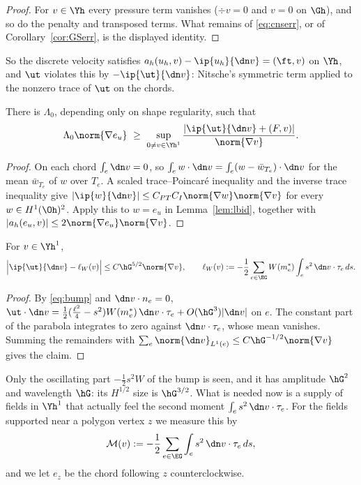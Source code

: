\begin{proof}
For $v\in\Yh$ every pressure term vanishes ($\div v=0$ and $v=0$ on $\Gh$), and so do the penalty and transposed terms. What remains of \eqref{eq:cnserr}, or of Corollary~\ref{cor:GSerr}, is the displayed identity.
\end{proof}

So the discrete velocity satisfies $a_h(u_h,v)-\ip{u_h}{\dn v}=(\ft,v)$ on $\Yh$, and $\ut$ violates this by $-\ip{\ut}{\dn v}$: Nitsche's symmetric term applied to the nonzero trace of $\ut$ on the chords.

\begin{lemma}\label{lem:lbabs}
There is $\Lambda_0$, depending only on shape regularity, such that
\[
\Lambda_0\norm{\nabla e_u}\ \ge\ \sup_{0\ne v\in\Yh^1}\frac{|\ip{\ut}{\dn v}+(F,v)|}{\norm{\nabla v}} .
\]
\end{lemma}

\begin{proof}
On each chord $\int_e\dn v=0$, so $\int_ew\cdot\dn v=\int_e(w-\bar w_{T_e})\cdot\dn v$ for the mean $\bar w_{T_e}$ of $w$ over $T_e$. A scaled trace--Poincar\'e inequality and the inverse trace inequality give $|\ip{w}{\dn v}|\le C_{PT}C_I\norm{\nabla w}\norm{\nabla v}$ for every $w\in H^1(\Oh)^2$. Apply this to $w=e_u$ in Lemma~\ref{lem:lbid}, together with $|a_h(e_u,v)|\le2\norm{\nabla e_u}\norm{\nabla v}$.
\end{proof}

\begin{lemma}\label{lem:lbexp}
For $v\in\Yh^1$,
\[
\Bigl|\ip{\ut}{\dn v}-\ell_W(v)\Bigr|\le C\hG^{5/2}\norm{\nabla v},\qquad \ell_W(v):=-\frac12\sum_{e\in\EG}W(m_e^\ast)\int_e s^2\,\dn v\cdot\tau_e\,ds .
\]
\end{lemma}

\begin{proof}
By \eqref{eq:bump} and $\dn v\cdot n_e=0$, $\ut\cdot\dn v=\frac12(\frac{\ell^2}4-s^2)W(m_e^\ast)\,\dn v\cdot\tau_e+O(\hG^3)|\dn v|$ on $e$. The constant part of the parabola integrates to zero against $\dn v\cdot\tau_e$, whose mean vanishes. Summing the remainders with $\sum_e\norm{\dn v}_{L^1(e)}\le C\hG^{-1/2}\norm{\nabla v}$ gives the claim.
\end{proof}

Only the oscillating part $-\frac12s^2W$ of the bump is seen, and it has amplitude $\hG^2$ and wavelength $\hG$: its $H^{1/2}$ size is $\hG^{3/2}$. What is needed now is a supply of fields in $\Yh^1$ that actually feel the second moment $\int_es^2\,\dn v\cdot\tau_e$. For the fields supported near a polygon vertex $z$ we measure this by
\[
\mathcal M(v):=-\frac12\sum_{e\in\EG}\int_e s^2\,\dn v\cdot\tau_e\,ds ,
\]
and we let $e_z$ be the chord following $z$ counterclockwise.

